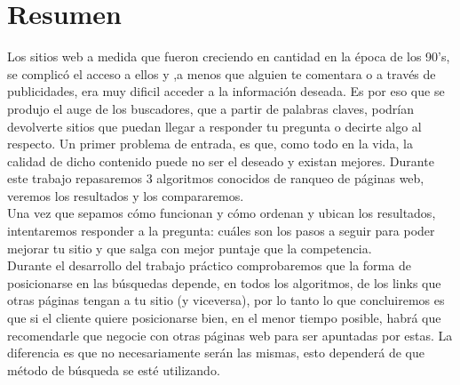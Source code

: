 \section{Resumen}

Los sitios web a medida que fueron creciendo en cantidad en la época de los 90's, se complicó el acceso a ellos y ,a menos que alguien te comentara o a través de publicidades, era muy dificil acceder a la información deseada. Es por eso que se produjo el auge de los buscadores, que a partir de palabras claves, podrían devolverte sitios que  puedan llegar a responder tu pregunta o decirte algo al respecto. 
Un primer problema de entrada, es que, como todo en la vida, la calidad de dicho contenido puede no ser el deseado y existan mejores. Durante este trabajo repasaremos 3 algoritmos conocidos de ranqueo de páginas web, veremos los resultados y los compararemos. \\
Una vez que sepamos cómo funcionan y cómo ordenan y ubican los resultados, intentaremos responder a la pregunta: cuáles son los pasos a seguir para poder mejorar tu sitio y que salga con mejor puntaje que la competencia.\\
Durante el desarrollo del trabajo práctico comprobaremos que la forma de posicionarse en las búsquedas depende, en todos los algoritmos, de los links que otras páginas tengan a tu sitio (y viceversa), por lo tanto lo que concluiremos es que si el cliente quiere posicionarse bien, en el menor tiempo posible, habrá que recomendarle que negocie con otras páginas web para ser apuntadas por estas. La diferencia es que no necesariamente serán las mismas, esto dependerá de que método de búsqueda se esté utilizando.
